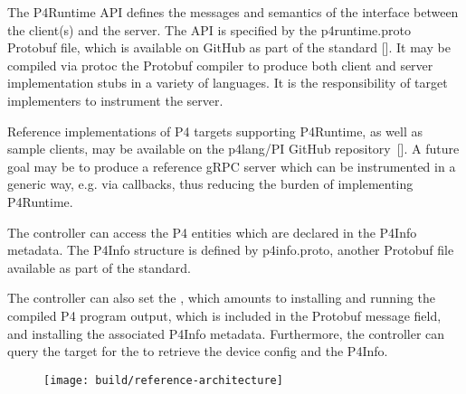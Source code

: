\documentclass[11pt]{article}
\begin{document}
{%
The P4Runtime API defines the messages and semantics of the interface between
the client(s) and the server. The API is specified by the p4runtime.proto
Protobuf file, which is available on GitHub as part of the standard
[].  It may be compiled via protoc \textemdash{} the Protobuf compiler \textemdash{}
to produce both client and server implementation stubs in a variety of
languages. It is the responsibility of target implementers to instrument the
server.%

Reference implementations of P4 targets supporting P4Runtime, as well as sample
clients, may be available on the p4lang/PI GitHub repository~[]. A future
goal may be to produce a reference gRPC server which can be instrumented in a
generic way, e.g. via callbacks, thus reducing the burden of implementing
P4Runtime.%

The controller can access the P4 entities which are declared in the P4Info
metadata. The P4Info structure is defined by p4info.proto, another Protobuf file
available as part of the standard.%

The controller can also set the , which amounts to
installing and running the compiled P4 program output, which is included in the
 Protobuf message field, and installing the associated P4Info
metadata. Furthermore, the controller can query the target for the
 to retrieve the device config and the P4Info.%

\begin{figure}[tbp]%
\begin{mdcenter}%

\noindent{}\texttt{[image: build/reference-architecture]}{}%

\mdhr{}%

\noindent{}%
\end{mdcenter}\label{fig-reference-architecture}%
\end{figure}%

}
\end{document}
